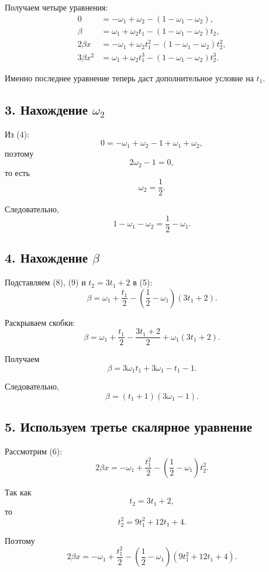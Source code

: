 \documentclass[12pt,a4paper]{article}
\begin{document}
	Получаем четыре уравнения:
	\begin{align}
		0&=-\omega_1+\omega_2-(1-\omega_1-\omega_2),
		\tag{4}\\
		\beta&=\omega_1+\omega_2t_1-(1-\omega_1-\omega_2)t_2,
		\tag{5}\\
		2\beta x&=-\omega_1+\omega_2t_1^2-(1-\omega_1-\omega_2)t_2^2,
		\tag{6}\\
		3\beta x^2&=\omega_1+\omega_2t_1^3-(1-\omega_1-\omega_2)t_2^3.
		\tag{7}
	\end{align}
	
	Именно последнее уравнение теперь даст дополнительное условие на $t_1$.
	
	\subsection*{3. Нахождение $\omega_2$}
	
	Из (4):
	\[
	0=-\omega_1+\omega_2-1+\omega_1+\omega_2,
	\]
	поэтому
	\[
	2\omega_2-1=0,
	\]
	то есть
	\[
	\boxed{\omega_2=\frac12}.
	\tag{8}
	\]
	
	Следовательно,
	\[
	1-\omega_1-\omega_2=\frac12-\omega_1.
	\tag{9}
	\]
	
	\subsection*{4. Нахождение $\beta$}
	
	Подставляем (8), (9) и $t_2=3t_1+2$ в (5):
	\[
	\beta
	=
	\omega_1+\frac{t_1}{2}
	-\left(\frac12-\omega_1\right)(3t_1+2).
	\]
	
	Раскрываем скобки:
	\[
	\beta
	=
	\omega_1+\frac{t_1}{2}
	-\frac{3t_1+2}{2}
	+\omega_1(3t_1+2).
	\]
	
	Получаем
	\[
	\beta=3\omega_1t_1+3\omega_1-t_1-1.
	\]
	
	Следовательно,
	\[
	\boxed{\beta=(t_1+1)(3\omega_1-1)}.
	\tag{10}
	\]
	
	\subsection*{5. Используем третье скалярное уравнение}
	
	Рассмотрим (6):
	\[
	2\beta x
	=
	-\omega_1+\frac{t_1^2}{2}
	-\left(\frac12-\omega_1\right)t_2^2.
	\]
	
	Так как
	\[
	t_2=3t_1+2,
	\]
	то
	\[
	t_2^2=9t_1^2+12t_1+4.
	\]
	
	Поэтому
	\[
	2\beta x
	=
	-\omega_1+\frac{t_1^2}{2}
	-\left(\frac12-\omega_1\right)
	(9t_1^2+12t_1+4).
	\]
	
\end{document}

